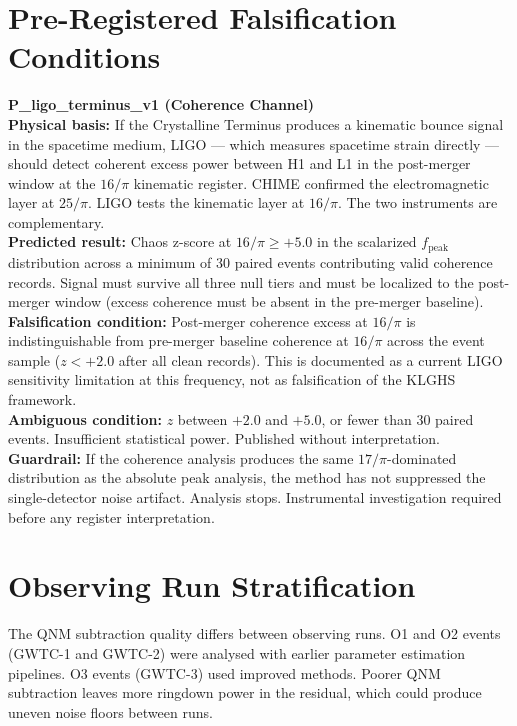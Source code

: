 \documentclass[11pt, letterpaper, openany]{book}
\begin{document}
\section*{Pre-Registered Falsification Conditions}

\begin{predictionbox}
\textbf{P\_ligo\_terminus\_v1 (Coherence Channel)}\\[0.5em]
\textbf{Physical basis:} If the Crystalline Terminus produces a kinematic
bounce signal in the spacetime medium, LIGO --- which measures spacetime
strain directly --- should detect coherent excess power between H1 and
L1 in the post-merger window at the $16/\pi$ kinematic register.
CHIME confirmed the electromagnetic layer at $25/\pi$. LIGO tests the
kinematic layer at $16/\pi$. The two instruments are complementary.\\[0.5em]
\textbf{Predicted result:} Chaos z-score at $16/\pi \geq +5.0$ in the
scalarized $f_{\text{peak}}$ distribution across a minimum of 30
paired events contributing valid coherence records. Signal must survive
all three null tiers and must be localized to the post-merger window
(excess coherence must be absent in the pre-merger baseline).\\[0.5em]
\textbf{Falsification condition:} Post-merger coherence excess at
$16/\pi$ is indistinguishable from pre-merger baseline coherence
at $16/\pi$ across the event sample ($z < +2.0$ after all clean
records). This is documented as a current LIGO sensitivity limitation
at this frequency, not as falsification of the KLGHS framework.\\[0.5em]
\textbf{Ambiguous condition:} $z$ between $+2.0$ and $+5.0$, or
fewer than 30 paired events. Insufficient statistical power.
Published without interpretation.\\[0.5em]
\textbf{Guardrail:} If the coherence analysis produces the same
$17/\pi$-dominated distribution as the absolute peak analysis,
the method has not suppressed the single-detector noise artifact.
Analysis stops. Instrumental investigation required before
any register interpretation.
\end{predictionbox}

\section*{Observing Run Stratification}

The QNM subtraction quality differs between observing runs. O1 and O2
events (GWTC-1 and GWTC-2) were analysed with earlier parameter
estimation pipelines. O3 events (GWTC-3) used improved methods.
Poorer QNM subtraction leaves more ringdown power in the residual,
which could produce uneven noise floors between runs.
\end{document}
